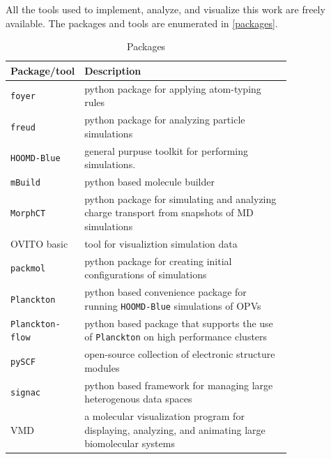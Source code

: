 All the tools used to implement, analyze, and
visualize this work are freely available. 
The packages and tools are enumerated in \autoref{packages}.
\begin{table}[]
    \caption{Packages} %
\centering %
\begin{tabular}{|l|p{0.8\linewidth}|} %
\hline\hline %
Package/tool & Description \\ [0.5ex] %
\hline %
    \texttt{foyer} & python package for applying atom-typing rules  \cite{Klein2018a}\\ [1ex] %
\texttt{freud} & python package for analyzing particle simulations  \cite{Ramasubramani2020}\\ [1ex] %
\texttt{HOOMD-Blue} & general purpuse toolkit for performing simulations.   \cite{Anderson2020a}\\ [1ex] %
    \texttt{mBuild} & python based molecule builder \cite{Klein2018a}\\ [1ex] %
\texttt{MorphCT} & python package for simulating and analyzing charge transport from 
    snapshots of MD simulations \cite{jones2017}\cite{cmelab}\\[1ex] 
OVITO basic & tool for visualiztion simulation data \cite{Stukowski2010a}\\[1ex] 
\texttt{packmol} & python package for creating initial configurations of simulations \cite{Martinez2009}\\[1ex] 
\texttt{Planckton} & python based convenience package for running \texttt{HOOMD-Blue}
    simulations of OPVs \cite{cmelab}\\[1ex]
    \texttt{Planckton-flow} & python based package that supports the use of \texttt{Planckton} on
    high performance clusters\cite{cmelab}\\[1ex]
\texttt{pySCF} & open-source collection of electronic structure modules \cite{Sun2018a}\\[1ex]
\texttt{signac} & python based framework for managing large heterogenous data spaces \cite{Adorf2016}\\[1ex]
VMD & a molecular visualization program for displaying, analyzing, and animating large biomolecular
    systems \cite{Humphrey1996}\\


\hline %
\end{tabular}
\label{packages} %
\end{table}

